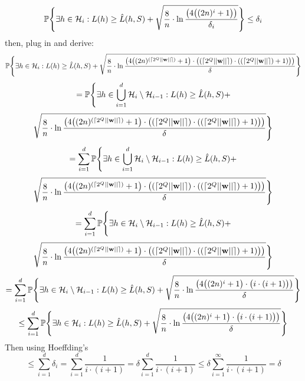 \documentclass{scrartcl}
\begin{document}
\[
    \mathbb{P} \Bigg\{
        \exists h \in {\mathcal{H}}_i : L(h) \geq \hat{L} (h, S) +
        \sqrt {
            \frac {8} {n} \cdot \ln
            \frac  { \big(
            4 \big(
            ( 2n )^i + 1
            \big)
            \big ) } {\delta_i}
        }
    \Bigg\} \leq \delta_i
\]
 then, plug in and derive:
\[
    \mathbb{P} \Bigg\{
        \exists h \in {\mathcal{H}}_i : L(h) \geq \hat{L} (h, S) +
        \sqrt {
            \frac {8} {n} \cdot \ln
            \frac { \big(
            4 \big(
                ( 2n )^{(\lceil 2^Q || {\mathbf w} ||\rceil)} + 1
            \big)
            \cdot
            \big( {(\lceil 2^Q || {\mathbf w} ||\rceil)} \cdot ({(\lceil 2^Q || {\mathbf w} ||\rceil)} + 1) \big)
            \big) } {\delta}
        }
    \Bigg\}
\]
\[ =
    \mathbb{P} \Bigg\{
        \exists h \in \bigcup^d_{i=1 }{\mathcal{H}}_i \setminus {\mathcal{H}}_{i-1} : L(h) \geq \hat{L} (h, S) + \]
\[        \sqrt {
            \frac {8} {n} \cdot \ln
            \frac { \big(
            4 \big(
                ( 2n )^{(\lceil 2^Q || {\mathbf w} ||\rceil)} + 1
            \big)
            \cdot
            \big( {(\lceil 2^Q || {\mathbf w} ||\rceil)} \cdot ({(\lceil 2^Q || {\mathbf w} ||\rceil)} + 1) \big)
            \big) } {\delta}
        }
    \Bigg\}
\]
\[ = \sum^d_{i=1}
    \mathbb{P} \Bigg\{
        \exists h \in \bigcup^d_{i=1 }{\mathcal{H}}_i \setminus {\mathcal{H}}_{i-1} : L(h) \geq \hat{L} (h, S) + \]
\[        \sqrt {
            \frac {8} {n} \cdot \ln
            \frac { \big(
            4 \big(
                ( 2n )^{(\lceil 2^Q || {\mathbf w} ||\rceil)} + 1
            \big)
            \cdot
            \big( {(\lceil 2^Q || {\mathbf w} ||\rceil)} \cdot ({(\lceil 2^Q || {\mathbf w} ||\rceil)} + 1) \big)
            \big) } {\delta}
        }
    \Bigg\}
\]
\[ = \sum^d_{i=1}
    \mathbb{P} \Bigg\{
        \exists h \in {\mathcal{H}}_i \setminus {\mathcal{H}}_{i-1} : L(h) \geq \hat{L} (h, S) + \]
\[        \sqrt {
            \frac {8} {n} \cdot \ln
            \frac { \big(
            4 \big(
                ( 2n )^{(\lceil 2^Q || {\mathbf w} ||\rceil)} + 1
            \big)
            \cdot
            \big( {(\lceil 2^Q || {\mathbf w} ||\rceil)} \cdot ({(\lceil 2^Q || {\mathbf w} ||\rceil)} + 1) \big)
            \big) } {\delta}
        }
    \Bigg\}
\]
\[ = \sum^d_{i=1}
    \mathbb{P} \Bigg\{
        \exists h \in {\mathcal{H}}_i \setminus {\mathcal{H}}_{i-1} : L(h) \geq \hat{L} (h, S) +
        \sqrt {
            \frac {8} {n} \cdot \ln
            \frac { \big(
            4 \big(
                ( 2n )^i + 1
            \big)
            \cdot
            \big( i \cdot (i + 1) \big)
            \big) } {\delta}
        }
    \Bigg\}
\]
\[ \leq \sum^d_{i=1}
    \mathbb{P} \Bigg\{
        \exists h \in {\mathcal{H}}_i : L(h) \geq \hat{L} (h, S) +
        \sqrt {
            \frac {8} {n} \cdot \ln
            \frac { \big(
            4 \big(
                ( 2n )^i + 1
            \big)
            \cdot
            \big( i \cdot (i + 1) \big)
            \big) } {\delta}
        }
    \Bigg\}
\]
Then using Hoeffding's
\[
    \leq \sum^d_{i=1} \delta_i = \sum^d_{i=1} \frac {1} {i \cdot (i + 1)} =
    \delta \sum^d_{i=1} \frac {1}
    {i \cdot (i + 1)} \leq \delta \sum^\infty_{i=1} \frac {1} {i \cdot (i + 1)} = \delta
\]
\end{document}
